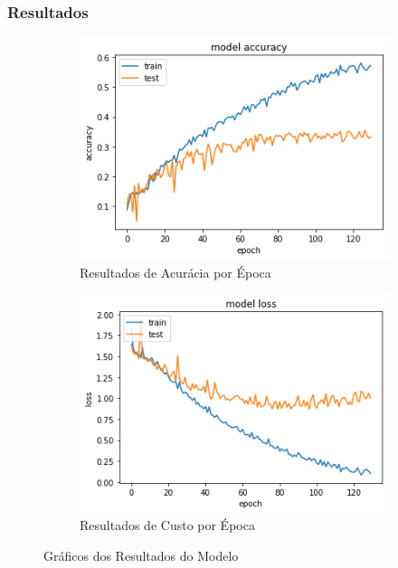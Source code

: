 \subsubsection{Resultados}

\begin{figure}[H]
  \centering
  \begin{subfigure}[b]{0.45\linewidth}
    \includegraphics[width=\linewidth]{img/enc-dec-1.png}
    \caption{Resultados de Acurácia por Época}
  \end{subfigure}
  \begin{subfigure}[b]{0.45\linewidth}
    \includegraphics[width=\linewidth]{img/enc-dec-1-loss.png}
    \caption{Resultados de Custo por Época}
  \end{subfigure}
  \caption{Gráficos dos Resultados do Modelo}
  \label{fig:plots1}
\end{figure}

